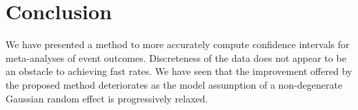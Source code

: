 \documentclass[12pt]{article}
\newcommand{\y}{y}
\newcommand{\nGH}{n_{GH}}
\begin{document}
\begin{table}[htbp]
  \centering
  
\caption{Convergence of the Bartlett-corrected CI as the two tuning parameters of the Poisson-normal model are increased. The endpoints of the CI in the lower right cell, given by $\nGH=20, \y_{max}=\num{1.5e3}$, are each within $\num{3e-4}$ of the CI $(.0182745,1.611421)$ obtained for $\nGH=\num{1e2}, \y_{max}=\num{1e5}$.}
\label{tab:data-analysis:pn-matrix}
\end{table}



\section{Conclusion}
\label{sec:conclusion}

We have presented a method to more accurately compute confidence
intervals for meta-analyses of event outcomes. Discreteness of the data does not appear to be an obstacle to achieving fast rates. We have seen that the improvement offered by the
proposed method deteriorates as the model assumption of a
non-degenerate Gaussian random effect is progressively relaxed.
\end{document}
